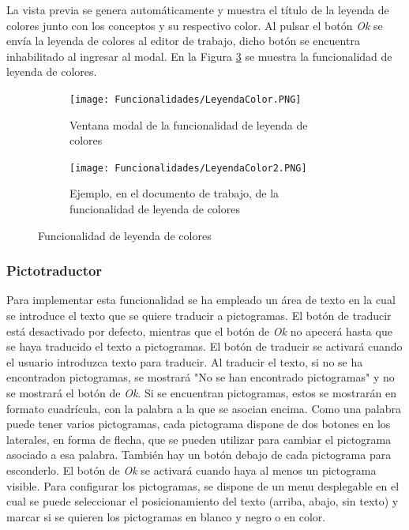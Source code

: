 La vista previa se genera automáticamente y muestra el título de la leyenda de colores junto con los conceptos y su respectivo color. Al pulsar el botón \textit{Ok} se envía la leyenda de colores al editor de trabajo, dicho botón se encuentra inhabilitado al ingresar al modal. En la Figura \ref{fig:leyendacolor} se muestra la funcionalidad de leyenda de colores.

\begin{figure}[ht!]
  \centering
  \begin{subfigure}{\textwidth}
    \centering
    \texttt{[image: Funcionalidades/LeyendaColor.PNG]}
    \caption{Ventana modal de la funcionalidad de leyenda de colores}
    \label{fig:leyendacolor01}
  \end{subfigure}

  \begin{subfigure}{\textwidth}
    \centering
    \texttt{[image: Funcionalidades/LeyendaColor2.PNG]}
    \caption{Ejemplo, en el documento de trabajo, de la funcionalidad de leyenda de colores}
    \label{fig:leyendacolor02}
  \end{subfigure}

  \caption{Funcionalidad de leyenda de colores}
  \label{fig:leyendacolor}
\end{figure}

\subsubsection{Pictotraductor}
\label{sec:imppictotraductor}
Para implementar esta funcionalidad se ha empleado un área de texto en la cual se introduce el texto que se quiere traducir a pictogramas. El botón de traducir está desactivado por defecto, mientras que el botón de \textit{Ok} no apecerá hasta que se haya traducido el texto a pictogramas. El botón de traducir se activará cuando el usuario introduzca texto para traducir. Al traducir el texto, si no se ha encontradon pictogramas, se mostrará "No se han encontrado pictogramas" y no se mostrará el botón de \textit{Ok}. Si se encuentran pictogramas, estos se mostrarán en formato cuadrícula, con la palabra a la que se asocian encima. Como una palabra puede tener varios pictogramas, cada pictograma dispone de dos botones en los laterales, en forma de flecha, que se pueden utilizar para cambiar el pictograma asociado a esa palabra. También hay un botón debajo de cada pictograma para esconderlo. El botón de \textit{Ok} se activará cuando haya al menos un pictograma visible. Para configurar los pictogramas, se dispone de un menu desplegable en el cual se puede seleccionar el posicionamiento del texto (arriba, abajo, sin texto) y marcar si se quieren los pictogramas en blanco y negro o en color.

